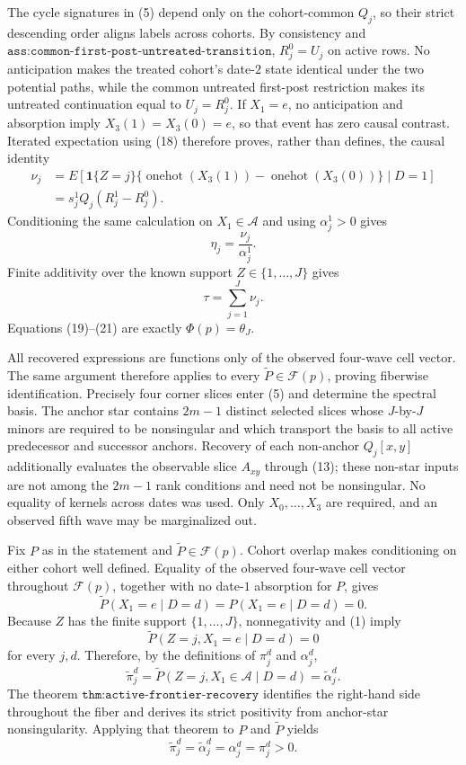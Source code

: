 The cycle signatures in (5) depend only on the cohort-common \(Q_j\), so their strict descending order aligns labels across cohorts.  By consistency and \(\texttt{ass:common-first-post-untreated-transition}\), \(R_j^0=U_j\) on active rows.  No anticipation makes the treated cohort's date-\(2\) state identical under the two potential paths, while the common untreated first-post restriction makes its untreated continuation equal to \(U_j=R_j^0\).  If \(X_1=e\), no anticipation and absorption imply \(X_3(1)=X_3(0)=e\), so that event has zero causal contrast.  Iterated expectation using (18) therefore proves, rather than defines, the causal identity
\[
\begin{aligned}
 \nu_j
 &=E\!\left[\mathbf1\{Z=j\}
 \{\operatorname{onehot}(X_3(1))-\operatorname{onehot}(X_3(0))\}
 \mid D=1\right]\\
 &=s_j^1Q_j(R_j^1-R_j^0).
\end{aligned}
\tag{19}
\]
Conditioning the same calculation on \(X_1\in\mathcal A\) and using \(\alpha_j^1>0\) gives
\[
 \eta_j=\frac{\nu_j}{\alpha_j^1}.
\tag{20}
\]
Finite additivity over the known support \(Z\in\{1,\ldots,J\}\) gives
\[
 \tau=\sum_{j=1}^J\nu_j.
\tag{21}
\]
Equations (19)--(21) are exactly \(\Phi(p)=\theta_J\).

All recovered expressions are functions only of the observed four-wave cell vector.  The same argument therefore applies to every \(\widetilde P\in\mathcal F(p)\), proving fiberwise identification.  Precisely four corner slices enter (5) and determine the spectral basis.  The anchor star contains \(2m-1\) distinct selected slices whose \(J\)-by-\(J\) minors are required to be nonsingular and which transport the basis to all active predecessor and successor anchors.  Recovery of each non-anchor \(Q_j[x,y]\) additionally evaluates the observable slice \(A_{xy}\) through (13); these non-star inputs are not among the \(2m-1\) rank conditions and need not be nonsingular.  No equality of kernels across dates was used.  Only \(X_0,\ldots,X_3\) are required, and an observed fifth wave may be marginalized out.

Fix \(P\) as in the statement and \(\widetilde P\in\mathcal F(p)\).  Cohort overlap makes conditioning on either cohort well defined.  Equality of the observed four-wave cell vector throughout \(\mathcal F(p)\), together with no date-\(1\) absorption for \(P\), gives
\[
 \widetilde P(X_1=e\mid D=d)=P(X_1=e\mid D=d)=0.
\tag{1}
\]
Because \(Z\) has the finite support \(\{1,\ldots,J\}\), nonnegativity and (1) imply
\[
 \widetilde P(Z=j,X_1=e\mid D=d)=0
\tag{2}
\]
for every \(j,d\).  Therefore, by the definitions of \(\pi_j^d\) and \(\alpha_j^d\),
\[
 \widetilde\pi_j^d
 =\widetilde P(Z=j,X_1\in\mathcal A\mid D=d)
 =\widetilde\alpha_j^d.
\tag{3}
\]
The theorem \(\texttt{thm:active-frontier-recovery}\) identifies the right-hand side throughout the fiber and derives its strict positivity from anchor-star nonsingularity.  Applying that theorem to \(P\) and \(\widetilde P\) yields
\[
 \widetilde\pi_j^d=\widetilde\alpha_j^d
 =\alpha_j^d=\pi_j^d>0.
\tag{4}
\]

